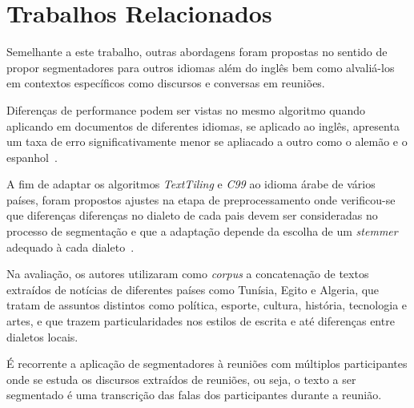 \section{Trabalhos Relacionados}
	\label{sec:trabalhos}


Semelhante a este trabalho, outras abordagens foram propostas no sentido de propor segmentadores para outros idiomas além do inglês bem como alvaliá-los em contextos específicos como discursos e conversas em reuniões.

Diferenças de performance podem ser vistas no mesmo algoritmo quando aplicando em documentos de diferentes idiomas, se aplicado ao inglês, apresenta um taxa de erro significativamente menor se apliacado a outro como o alemão e o espanhol~\cite{Kern2009}.


A fim de adaptar os algoritmos \textit{TextTiling} e \textit{C99} ao idioma árabe de vários países, foram propostos ajustes na etapa de preprocessamento onde verificou-se que diferenças diferenças no dialeto de cada pais devem ser consideradas no processo de segmentação e que a adaptação depende da escolha de um \textit{stemmer} adequado à cada dialeto~\cite{CHAIBI2014}.


Na avaliação, os autores utilizaram como \textit{corpus} a concatenação de textos extraídos de notícias de diferentes países como Tunísia, Egito e Algeria, que tratam de assuntos distintos como política, esporte, cultura, história, tecnologia e artes, e que trazem particularidades nos estilos de escrita e até diferenças entre dialetos locais. %




É recorrente a aplicação de segmentadores à reuniões com múltiplos participantes onde se estuda os discursos extraídos de reuniões, ou seja, o texto a ser segmentado é uma transcrição das falas dos participantes durante a reunião.
%

